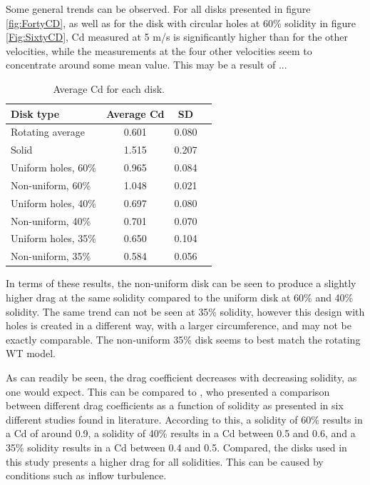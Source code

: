 Some general trends can be observed. For all disks presented in figure \ref{fig:FortyCD}, as well as for the disk with circular holes at 60\% solidity in figure \ref{Fig:SixtyCD}, Cd measured at 5 m/s is significantly higher than for the other velocities, while the measurements at the four other velocities seem to concentrate around some mean value. This may be a result of ... 


\begin{table}[H]
    \centering
    \begin{tabular}{l c c r}
         Disk type & Average Cd & SD \\
         \hline
         Rotating average & 0.601 & 0.080 \\
         Solid & 1.515 & 0.207 \\
         Uniform holes, 60\% & 0.965 & 0.084 \\
         Non-uniform, 60\% & 1.048 & 0.021 \\
         Uniform holes, 40\% & 0.697 & 0.080 \\
         Non-uniform, 40\% & 0.701 & 0.070 \\
         Uniform holes, 35\% & 0.650 & 0.104 \\
         Non-uniform, 35\% & 0.584 & 0.056 \\
    \end{tabular}
    \caption{Average Cd for each disk.}
    \label{tab:AvgCD}
\end{table}


In terms of these results, the non-uniform disk can be seen to produce a slightly higher drag at the same solidity compared to the uniform disk at 60\% and 40\% solidity. The same trend can not be seen at 35\% solidity, however this design with holes is created in a different way, with a larger circumference, and may not be exactly comparable. The non-uniform 35\% disk seems to best match the rotating WT model. 

As can readily be seen, the drag coefficient decreases with decreasing solidity, as one would expect. This can be compared to \cite{Lignarolo2016}, who presented a comparison between different drag coefficients as a function of solidity as presented in six different studies found in literature. According to this, a solidity of 60\% results in a Cd of around 0.9, a solidity of 40\% results in a Cd between 0.5 and 0.6, and a 35\% solidity results in a Cd between 0.4 and 0.5. Compared, the disks used in this study presents a higher drag for all solidities. This can be caused by conditions such as inflow turbulence. 

